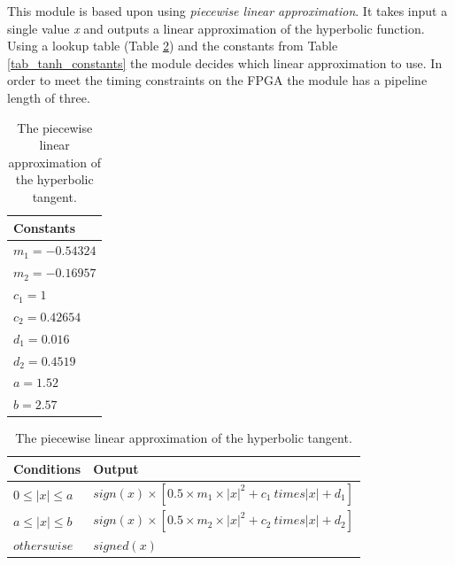 This module is based upon \cite{XXXXXXXXXX} using \textit{piecewise linear approximation}. It takes input a single value \textit{x} and outputs a linear approximation of the hyperbolic function. Using a lookup table (Table \ref{tab_tanh}) and the constants from Table \ref{tab_tanh_constants} the module decides which linear approximation to use. 
In order to meet the timing constraints on the FPGA the module has a pipeline length of three. 

\begin{table}
	\centering
    \begin{tabular}{| >{\centering\arraybackslash}m{1.2in} |} 
    \hline
    Constants \\ \hline
    $ m_1 = -0.54324 $ \\ \hline
    $ m_2 = -0.16957 $ \\ \hline
    $ c_1 = 1 $ \\ \hline
    $ c_2 = 0.42654 $ \\ \hline
    $ d_1 = 0.016 $ \\ \hline
    $ d_2 = 0.4519 $ \\ \hline
    $ a = 1.52 $ \\ \hline
    $ b = 2.57 $ \\ \hline
        \end{tabular}
    \caption{The constant used for the hyperbolic tangent approximation.}
   	\label{tab_tanh_constants}
    
    
	\centering
    \begin{tabular}{| >{\centering\arraybackslash}m{1.2in} | >{\centering\arraybackslash}m{2.5in} |} 
    \hline
    Conditions & Output \\ \hline
    $ 0 \le |x| \le a $ & $ sign(x) \times [0.5 \times m_1 \times |x|^2 + c_1 \ times |x| + d_1] $\\ \hline
    $ a \le |x| \le b $ & $ sign(x) \times [0.5 \times m_2 \times |x|^2 + c_2 \ times |x| + d_2] $\\ \hline
   	$ otherswise $ & $ signed(x) $\\ \hline
        \end{tabular}
    \caption{The piecewise linear approximation of the hyperbolic tangent.}
   	\label{tab_tanh}
    
\end{table}

\vspace*{1\baselineskip}



